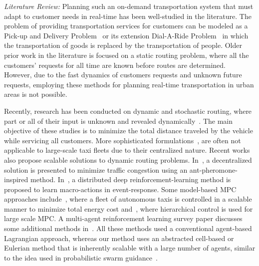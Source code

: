 \documentclass[journal]{IEEEtran}
\begin{document}
\emph{Literature Review:} Planning such an on-demand transportation system that must adapt to customer needs in real-time has been well-studied in the literature. The problem of providing transportation services for customers can be modeled as a Pick-up and Delivery Problem~\cite{StaticSur} or its extension Dial-A-Ride Problem~\cite{DARP} in which the transportation of goods is replaced by the transportation of people. Older prior work in the literature is focused on a static routing problem, where all the customers' requests for all time are known before routes are determined. However, due to the fast dynamics of customers requests and unknown future requests, employing these methods for planning real-time transportation in urban areas is not possible. 

Recently, research has been conducted on dynamic and stochastic routing, where part or all of their input is unknown and revealed dynamically~\cite{DynHv,DynFra,DynamicSur,dynamic_congestion}. The main objective of these studies is to minimize the total distance traveled by the vehicle while servicing all customers. More sophisticated formulations~\cite{multi,Kim_2005}, are often not applicable to large-scale taxi fleets due to their centralized nature. Recent works also propose scalable solutions to dynamic routing problems. In~\cite{anticipatory_routing}, a decentralized solution is presented to minimize traffic congestion using an ant-pheromone-inspired method. In~\cite{deep_rl}, a distributed deep reinforcement-learning method is proposed to learn macro-actions in event-response. Some model-based MPC approaches include~\cite{cyber_car}, where a fleet of autonomous taxis is controlled in a scalable manner to minimize total energy cost and~\cite{schutter_2017}, where hierarchical control is used for large scale MPC. A multi-agent reinforcement learning survey paper discusses some additional methods in~\cite{schutter_2015}. All these methods used a conventional agent-based Lagrangian approach, whereas our method uses an abstracted cell-based or Eulerian method that is inherently scalable with a large number of agents, similar to the idea used in probabilistic swarm guidance~\cite{Bandyopadhyay_2017}.
\end{document}
